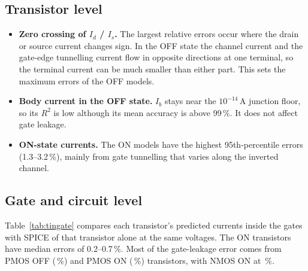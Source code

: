 \documentclass[12pt]{article}
\newcommand{\gentable}[1]{\resizebox{\linewidth}{!}{}}
\begin{document}
\subsection{Transistor level}
\label{sec:err_transistor}
\begin{itemize}
    \item \textbf{Zero crossing of $I_d$ / $I_s$.} The largest relative errors occur where the drain
          or source current changes sign. In the OFF state the channel current and the gate-edge
          tunnelling current flow in opposite directions at one terminal, so the terminal current
          can be much smaller than either part. This sets the maximum errors of the OFF models.
    \item \textbf{Body current in the OFF state.} $I_b$ stays near the $10^{-14}$\,A junction floor,
          so its $R^2$ is low although its mean accuracy is above 99\,\%. It does not affect gate
          leakage.
    \item \textbf{ON-state currents.} The ON models have the highest 95th-percentile errors
          (1.3--3.2\,\%), mainly from gate tunnelling that varies along the inverted channel.
\end{itemize}

\subsection{Gate and circuit level}
Table~\ref{tab:tingate} compares each transistor's predicted currents inside the gates with SPICE of
that transistor alone at the same voltages. The ON transistors have median errors of 0.2--0.7\,\%.
Most of the gate-leakage error comes from PMOS OFF (\PmosOffShare\,\%) and PMOS ON
(\PmosOnShare\,\%) transistors, with NMOS ON at \NmosOnShare\,\%.

\begin{table}[H]
\centering
\gentable{tab_transistor_in_gate}
\caption{Transistor currents inside the gates, ML vs single-transistor SPICE (median / p95 error
in \%), and each case's share of the gate-leakage error.}
\label{tab:tingate}
\end{table}
\end{document}
